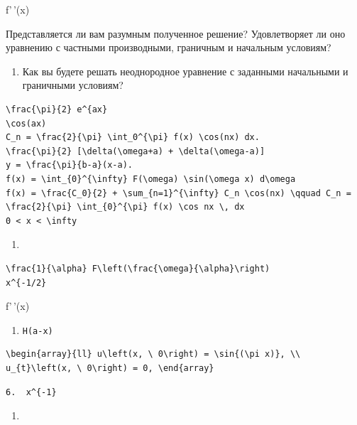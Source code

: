 \documentclass[
  ukrainian,
]{article}
\providecommand{\tightlist}{%
  \setlength{\itemsep}{0pt}\setlength{\parskip}{0pt}}
\begin{document}
f'\,'(x)

Представляется ли вам разумным полученное решение? Удовлетворяет ли оно
уравнению с частными производными, граничным и начальным условиям?

\begin{enumerate}
\def\labelenumi{\arabic{enumi}.}
\setcounter{enumi}{6}
\tightlist
\item
  Как вы будете решать неоднородное уравнение с заданными начальными и
  граничными условиям?
\end{enumerate}

\begin{verbatim}
\frac{\pi}{2} e^{ax}
\cos(ax)
C_n = \frac{2}{\pi} \int_0^{\pi} f(x) \cos(nx) dx.
\frac{\pi}{2} [\delta(\omega+a) + \delta(\omega-a)]
y = \frac{\pi}{b-a}(x-a).
f(x) = \int_{0}^{\infty} F(\omega) \sin(\omega x) d\omega
f(x) = \frac{C_0}{2} + \sum_{n=1}^{\infty} C_n \cos(nx) \qquad C_n = \frac{2}{\pi} \int_{0}^{\pi} f(x) \cos nx \, dx
0 < x < \infty
\end{verbatim}

\begin{enumerate}
\def\labelenumi{\arabic{enumi}.}
\tightlist
\item
\end{enumerate}

\begin{verbatim}
\frac{1}{\alpha} F\left(\frac{\omega}{\alpha}\right)
x^{-1/2}
\end{verbatim}

f'\,'(x)

\begin{enumerate}
\def\labelenumi{\arabic{enumi}.}
\setcounter{enumi}{4}
\tightlist
\item
  \texttt{H(a-x)}
\end{enumerate}

\begin{verbatim}
\begin{array}{ll} u\left(x, \ 0\right) = \sin{(\pi x)}, \\ u_{t}\left(x, \ 0\right) = 0, \end{array}
\end{verbatim}

\begin{verbatim}
6.  x^{-1} 
\end{verbatim}

\begin{enumerate}
\def\labelenumi{\alph{enumi})}
\tightlist
\item
\end{enumerate}
\end{document}

